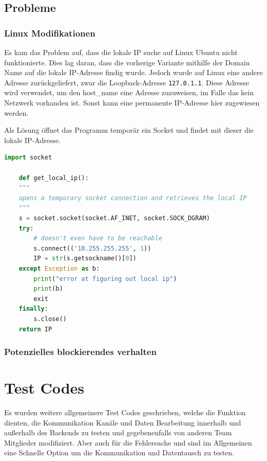 \subsection{Probleme}
\subsubsection{Linux Modifikationen}
Es kam das Problem auf, dass die lokale IP suche auf Linux Ubuntu nicht funktionierte.
Dies lag daran, dass die vorherige Variante 
mithilfe der Domain Name auf die lokale IP-Adresse findig wurde.
Jedoch wurde auf Linux eine andere Adresse zurückgeliefert, 
zwar die Loopback-Adresse \texttt{127.0.1.1}. 
Diese Adresse wird verwendet, um den host\_name eine Adresse zuzuweisen,
im Falle das kein Netzwerk vorhanden ist. 
Sonst kann eine permanente IP-Adresse hier zugewiesen werden.

Als Lösung öffnet das Programm temporär ein Socket und findet mit dieser die lokale IP-Adresse.
\begin{lstlisting}[language=python, gobble=4]
    import socket

    def get_local_ip():
    """
    opens a temporary socket connection and retrieves the local IP
    """
    s = socket.socket(socket.AF_INET, socket.SOCK_DGRAM)
    try:
        # doesn't even have to be reachable
        s.connect(('10.255.255.255', 1))
        IP = str(s.getsockname()[0])
    except Exception as b:
        print("error at figuring out local ip")
        print(b)
        exit
    finally:
        s.close()
    return IP
\end{lstlisting}

\subsubsection{Potenzielles blockierendes verhalten}

\section{Test Codes}
Es wurden weitere allgemeinere Test Codes geschrieben, 
welche die Funktion dienten, die Kommunikation Kanäle und Daten Bearbeitung innerhalb 
und außerhalb des Backends zu testen und gegebenenfalls von anderen Team Mitglieder modifiziert.
Aber auch für die Fehlersuche 
und sind im Allgemeinen eine Schnelle Option um die Kommunikation und Datentausch zu testen.

